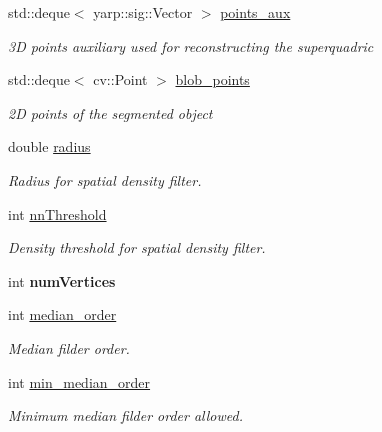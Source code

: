 \begin{DoxyCompactItemize}
\mbox{\label{classSuperqModule_a94cb68f67f8c51a188e12db5fad27565}} 
std\+::deque$<$ yarp\+::sig\+::\+Vector $>$ \mbox{\hyperlink{classSuperqModule_a94cb68f67f8c51a188e12db5fad27565}{points\+\_\+aux}}
\begin{DoxyCompactList}\small\item\em 3D points auxiliary used for reconstructing the superquadric \end{DoxyCompactList}\item 
\mbox{\label{classSuperqModule_a571d62b869e77e87b5fad6a13a72f813}} 
std\+::deque$<$ cv\+::\+Point $>$ \mbox{\hyperlink{classSuperqModule_a571d62b869e77e87b5fad6a13a72f813}{blob\+\_\+points}}
\begin{DoxyCompactList}\small\item\em 2D points of the segmented object \end{DoxyCompactList}\item 
\mbox{\label{classSuperqModule_a0751c095220723cf7d8b25b5d45a92e1}} 
double \mbox{\hyperlink{classSuperqModule_a0751c095220723cf7d8b25b5d45a92e1}{radius}}
\begin{DoxyCompactList}\small\item\em Radius for spatial density filter. \end{DoxyCompactList}\item 
\mbox{\label{classSuperqModule_ab7798766f824ed28f1f4dae8a3f1356c}} 
int \mbox{\hyperlink{classSuperqModule_ab7798766f824ed28f1f4dae8a3f1356c}{nn\+Threshold}}
\begin{DoxyCompactList}\small\item\em Density threshold for spatial density filter. \end{DoxyCompactList}\item 
\mbox{\label{classSuperqModule_a9cc4835f5280e71876b76331288b8dc2}} 
int {\bfseries num\+Vertices}
\item 
\mbox{\label{classSuperqModule_ae2d1a7a9301e43d148afda36fddd87b4}} 
int \mbox{\hyperlink{classSuperqModule_ae2d1a7a9301e43d148afda36fddd87b4}{median\+\_\+order}}
\begin{DoxyCompactList}\small\item\em Median filder order. \end{DoxyCompactList}\item 
\mbox{\label{classSuperqModule_a96b534ae428e744f2b44d35866490fdc}} 
int \mbox{\hyperlink{classSuperqModule_a96b534ae428e744f2b44d35866490fdc}{min\+\_\+median\+\_\+order}}
\begin{DoxyCompactList}\small\item\em Minimum median filder order allowed. \end{DoxyCompactList}\item 

\end{DoxyCompactItemize}
